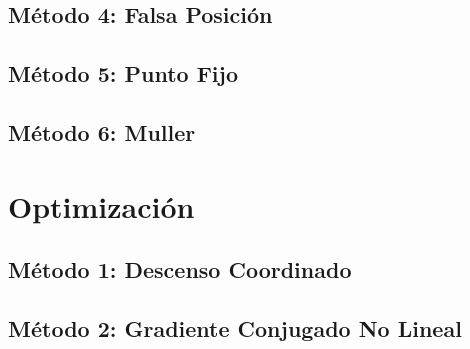 \documentclass[10pt,a4paper]{article}
\begin{document}
		\subsection{Método 4: Falsa Posición}
		
		
	
		\subsection{Método 5: Punto Fijo}
		
		
	
		\subsection{Método 6: Muller}
	
		
		
	\section{Optimización}
	
	\subsection{Método 1: Descenso Coordinado}
	
	
	
	\subsection{Método 2: Gradiente Conjugado No Lineal}
	
	
	
\end{document}
